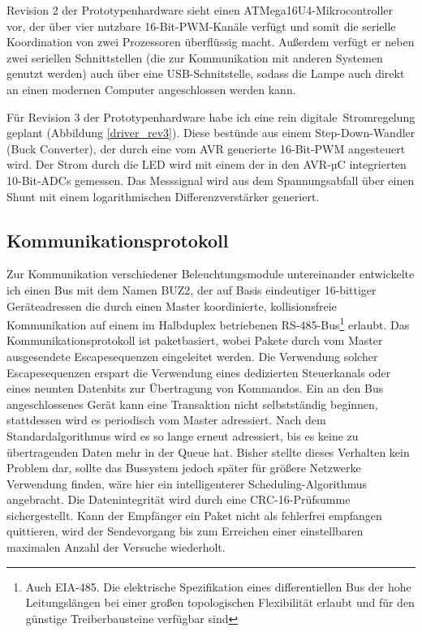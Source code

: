 \documentclass[12pt,a4paper,notitlepage]{article}
\begin{document}
Revision 2 der Prototypenhardware sieht einen ATMega16U4-Mikrocontroller vor, der über vier nutzbare 16-Bit-PWM-Kanäle verfügt und somit die serielle Koordination von zwei Prozessoren überflüssig macht. Außerdem verfügt er neben zwei seriellen Schnittstellen (die zur Kommunikation mit anderen Systemen genutzt werden) auch über eine USB-Schnitstelle, sodass die Lampe auch direkt an einen modernen Computer angeschlossen werden kann.

Für Revision 3 der Prototypenhardware habe ich eine rein \glqq digitale\grqq\ Stromregelung geplant (Abbildung \ref{driver_rev3}). Diese bestünde aus einem Step-Down-Wandler (Buck Converter)\cite{MAXIM24,MAXIM70,NATIONAL4,SPRUT1,MAXIM49},%
der durch eine vom AVR generierte 16-Bit-PWM angesteuert wird. Der Strom durch die LED wird mit einem der in den AVR-µC integrierten 10-Bit-ADCs gemessen. Das Messsignal wird aus dem Spannungsabfall über einen Shunt %
mit einem logarithmischen Differenzverstärker generiert\cite{MAXIM34}.

\subsection{Kommunikationsprotokoll}
Zur Kommunikation verschiedener Beleuchtungsmodule untereinander entwickelte ich einen Bus mit dem Namen BUZ2, der auf Basis eindeutiger 16-bittiger Geräteadressen die durch einen Master koordinierte, kollisionsfreie Kommunikation auf einem im \gls{Halbduplex} betriebenen RS-485-Bus\footnote{Auch EIA-485. Die elektrische Spezifikation eines differentiellen Bus der hohe Leitungslängen bei einer großen topologischen Flexibilität erlaubt und für den günstige Treiberbausteine verfügbar sind}\cite{MAXIM76} erlaubt. Das Kommunikationsprotokoll ist paketbasiert, wobei Pakete durch vom Master ausgesendete Escapesequenzen eingeleitet werden. Die Verwendung solcher Escapesequenzen erspart die Verwendung eines dedizierten Steuerkanals oder eines neunten Datenbits zur Übertragung von Kommandos. Ein an den Bus angeschlossenes Gerät kann eine Transaktion nicht selbstständig beginnen, stattdessen wird es periodisch vom Master adressiert. Nach dem Standardalgorithmus wird es so lange erneut adressiert, bis es keine zu übertragenden Daten mehr in der Queue hat. Bisher stellte dieses Verhalten kein Problem dar, sollte das Bussystem jedoch später für größere Netzwerke Verwendung finden, wäre hier ein intelligenterer Scheduling-Algorithmus angebracht. Die Datenintegrität wird durch eine CRC-16-Prüfsumme sichergestellt. Kann der Empfänger ein Paket nicht als fehlerfrei empfangen quittieren, wird der Sendevorgang bis zum Erreichen einer einstellbaren maximalen Anzahl der Versuche wiederholt\cite{LIBC1}.
\end{document}
